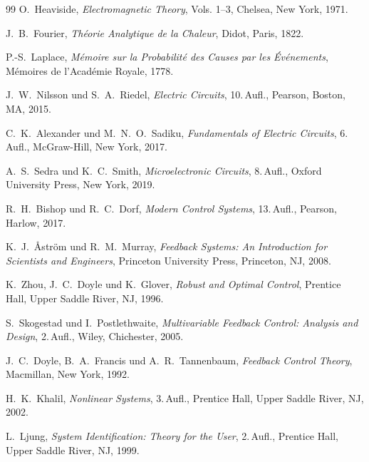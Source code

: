 \documentclass[a4paper, 12pt, twoside, openright]{report}
\theoremstyle{definition}
\theoremstyle{definition}
\begin{document}
\begin{thebibliography}{99}
	O.~Heaviside,
	\textit{Electromagnetic Theory},
	Vols. 1--3, Chelsea, New York, 1971.

	J.~B.~Fourier,
	\textit{Théorie Analytique de la Chaleur},
	Didot, Paris, 1822.

	P.-S.~Laplace,
	\textit{Mémoire sur la Probabilité des Causes par les Événements},
	Mémoires de l'Académie Royale, 1778.

	J.~W.~Nilsson und S.~A.~Riedel,
	\textit{Electric Circuits},
	10.\,Aufl., Pearson, Boston, MA, 2015.

	C.~K.~Alexander und M.~N.~O.~Sadiku,
	\textit{Fundamentals of Electric Circuits},
	6.\,Aufl., McGraw-Hill, New York, 2017.

	A.~S.~Sedra und K.~C.~Smith,
	\textit{Microelectronic Circuits},
	8.\,Aufl., Oxford University Press, New York, 2019.

	R.~H.~Bishop und R.~C.~Dorf,
	\textit{Modern Control Systems},
	13.\,Aufl., Pearson, Harlow, 2017.

	K.~J.~\AA str\"om und R.~M.~Murray,
	\textit{Feedback Systems: An Introduction for Scientists and Engineers},
	Princeton University Press, Princeton, NJ, 2008.

	K.~Zhou, J.~C.~Doyle und K.~Glover,
	\textit{Robust and Optimal Control},
	Prentice Hall, Upper Saddle River, NJ, 1996.

	S.~Skogestad und I.~Postlethwaite,
	\textit{Multivariable Feedback Control: Analysis and Design},
	2.\,Aufl., Wiley, Chichester, 2005.

	J.~C.~Doyle, B.~A.~Francis und A.~R.~Tannenbaum,
	\textit{Feedback Control Theory},
	Macmillan, New York, 1992.

	H.~K.~Khalil,
	\textit{Nonlinear Systems},
	3.\,Aufl., Prentice Hall, Upper Saddle River, NJ, 2002.

	L.~Ljung,
	\textit{System Identification: Theory for the User},
	2.\,Aufl., Prentice Hall, Upper Saddle River, NJ, 1999.


\end{thebibliography}
\end{document}
